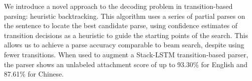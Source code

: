 We introduce a novel approach to the decoding problem in transition-based parsing: heuristic backtracking. This algorithm uses a series of partial parses on the sentence to locate the best candidate parse, using confidence estimates of transition decisions as a heuristic to guide the starting points of the search. This allows us to achieve a parse accuracy comparable to beam search, despite using fewer transitions. When used to augment a Stack-LSTM transition-based parser, the parser shows an unlabeled attachment score of up to 93.30\% for English and 87.61\% for Chinese.
